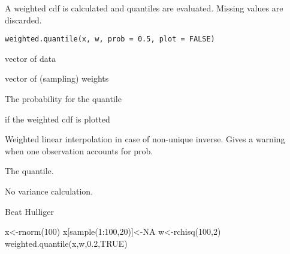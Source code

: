 %
\begin{Description}\relax
A weighted cdf is calculated and quantiles are evaluated. Missing values are discarded.
\end{Description}
%
\begin{Usage}
\begin{verbatim}
weighted.quantile(x, w, prob = 0.5, plot = FALSE)
\end{verbatim}
\end{Usage}
%
\begin{Arguments}
\begin{ldescription}
\item[\code{x}] vector of data
\item[\code{w}] vector of (sampling) weights
\item[\code{prob}] The probability for the quantile 
\item[\code{plot}] if  the weighted cdf is plotted
\end{ldescription}
\end{Arguments}
%
\begin{Details}\relax
Weighted linear interpolation in case of non-unique inverse. Gives a warning when one observation accounts for prob.
\end{Details}
%
\begin{Value}
The quantile.
\end{Value}
%
\begin{Note}\relax
No variance calculation. 
\end{Note}
%
\begin{Author}\relax
Beat Hulliger
\end{Author}
%
\begin{SeeAlso}\relax
{} 
\end{SeeAlso}
%
\begin{Examples}
\begin{ExampleCode}
x<-rnorm(100)
x[sample(1:100,20)]<-NA
w<-rchisq(100,2)
weighted.quantile(x,w,0.2,TRUE)
\end{ExampleCode}
\end{Examples}
